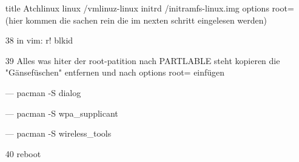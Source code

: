 \documentclass[a4paper,12pt]{article}
\begin{document}
\begin{itemize}
		\subitem title Atchlinux
		\subitem linux /vmlinuz-linux
		\subitem initrd /initramfs-linux.img
		\subitem options root=(hier kommen die sachen rein die im nexten schritt eingelesen werden)
	\item[38] in vim:    r! blkid
	\item[39] Alles was hiter der root-patition nach PARTLABLE steht kopieren die "Gänsefüschen" entfernen und nach options root=   einfügen
	\item[---] pacman -S dialog
	\item[---] pacman -S wpa\_supplicant
	\item[---] pacman -S wireless\_tools
	\item[40] reboot 
\end{itemize}
	
\end{document}
